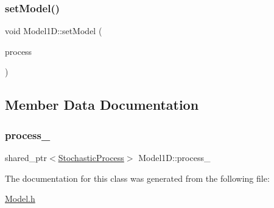\subsubsection{\texorpdfstring{set\+Model()}{setModel()}}
{\footnotesize\ttfamily void Model1\+D\+::set\+Model (\begin{DoxyParamCaption}\item[{const shared\+\_\+ptr$<$ \hyperlink{class_stochastic_process}{Stochastic\+Process} $>$ \&}]{process }\end{DoxyParamCaption})\hspace{0.3cm}{\ttfamily [inline]}}



\subsection{Member Data Documentation}
\hypertarget{class_model1_d_af3ea570fe242020bab49cc9530c6bd98}{}\label{class_model1_d_af3ea570fe242020bab49cc9530c6bd98} 
\subsubsection{\texorpdfstring{process\+\_\+}{process\_}}
{\footnotesize\ttfamily shared\+\_\+ptr$<$\hyperlink{class_stochastic_process}{Stochastic\+Process}$>$ Model1\+D\+::process\+\_\+\hspace{0.3cm}{\ttfamily [protected]}}



The documentation for this class was generated from the following file\+:\begin{DoxyCompactItemize}
\item 
\hyperlink{_model_8h}{Model.\+h}\end{DoxyCompactItemize}
